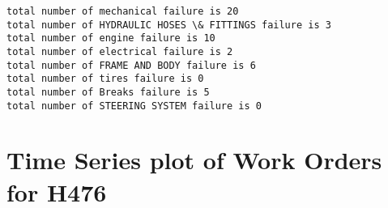 \documentclass[11pt]{article}
\begin{document}
    \begin{Verbatim}[commandchars=\\\{\}]
total number of mechanical failure is 20
total number of HYDRAULIC HOSES \& FITTINGS failure is 3
total number of engine failure is 10
total number of electrical failure is 2
total number of FRAME AND BODY failure is 6
total number of tires failure is 0
total number of Breaks failure is 5
total number of STEERING SYSTEM failure is 0

    \end{Verbatim}

    \section{Time Series plot of Work Orders for
H476}\label{time-series-plot-of-work-orders-for-h476}
\end{document}
